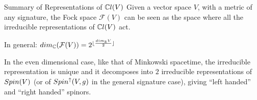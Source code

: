 \begin{frame}{Summary of Representations of $\mathbb C l(V)$} %
    Given a vector space $V$, with a metric of any signature, the Fock space $\mathcal F(V)$ can be seen as the space where all the irreducible representations of $\mathbb C l(V)$ act.

    In general: $dim_\mathbb C (\mathcal F(V)) = 2^{\lfloor\frac{dim_\mathbb R V}{2} \rfloor}$
    
    In the even dimensional case, like that of Minkowski spacetime, the irreducible representation is unique and it decomposes into $2$ irreducible representations of $Spin(V)$ (or of $Spin^\uparrow(V, g)$ in the general signature case), giving ``left handed'' and ``right handed'' spinors. %
\end{frame}